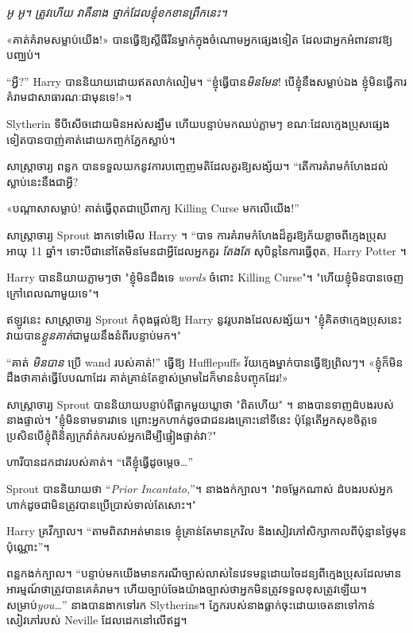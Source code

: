 \emph{អូ អូ។ ត្រូវហើយ វាគឺ\emph{នាង} ថ្នាក់ដែលខ្ញុំខកខានព្រឹកនេះ។}

«គាត់​គំរាម​សម្លាប់​យើង!» បានធ្វើឱ្យស្លីធីរីនម្នាក់ក្នុងចំណោមអ្នកផ្សេងទៀត ដែលជាអ្នកអំពាវនាវឱ្យបញ្ឈប់។

“អ្វី?” Harry បាននិយាយដោយឥតលាក់លៀម។ “ខ្ញុំធ្វើបាន\emph{មិនមែន}! បើ​ខ្ញុំ​នឹង​សម្លាប់​ឯង ខ្ញុំ​មិន​ធ្វើ​ការ​គំរាម​ជា​សាធារណៈ​ជា​មុន​ទេ!»។

Slytherin ទីបីសើចដោយមិនអស់សង្ឃឹម ហើយបន្ទាប់មកឈប់ភ្លាមៗ ខណៈដែលក្មេងប្រុសផ្សេងទៀតបានបាញ់គាត់ដោយកញ្ចក់ភ្នែកស្លាប់។

សាស្ត្រាចារ្យ ពន្លក បានទទួលយកនូវការបញ្ចេញមតិដែលគួរឱ្យសង្ស័យ។ “តើ​ការ​គំរាម​កំហែង​ដល់​ស្លាប់​នេះ​នឹង​ជា​អ្វី?

«​បណ្តាសា​សម្លាប់​! គាត់ធ្វើពុតជាប្រើពាក្យ Killing Curse មកលើយើង!”

សាស្រ្តាចារ្យ Sprout ងាកទៅមើល Harry ។ “បាទ ការគំរាមកំហែងដ៏គួរឱ្យភ័យខ្លាចពីក្មេងប្រុសអាយុ 11 ឆ្នាំ។ ទោះបីជានៅតែមិនមែនជាអ្វីដែលអ្នកគួរ \emph{តែងតែ} សុបិន្តនៃការធ្វើពុត, Harry Potter ។

Harry បាននិយាយភ្លាមៗថា "ខ្ញុំមិនដឹងទេ \emph{words} ចំពោះ Killing Curse"។ "ហើយ​ខ្ញុំ​មិន​បាន​ចេញ​ក្រៅ​ពេល​ណា​មួយ​ទេ"។

ឥឡូវនេះ សាស្រ្តាចារ្យ Sprout កំពុងផ្តល់ឱ្យ Harry នូវរូបរាងដែលសង្ស័យ។ "ខ្ញុំគិតថាក្មេងប្រុសនេះវាយបាន\emph{ខ្លួនគាត់}ជាមួយនឹងនំពីរបន្ទាប់មក។"

“គាត់ \emph{មិនបាន} ប្រើ wand របស់គាត់!” ធ្វើឱ្យ Hufflepuffs វ័យក្មេងម្នាក់បានធ្វើឱ្យព្រិលៗ។ «ខ្ញុំ​ក៏​មិន​ដឹង​ថា​គាត់​ធ្វើ​បែប​ណា​ដែរ គាត់​គ្រាន់​តែ​ខ្ទាស់​ម្រាមដៃ​ក៏​មាន​នំ​បញ្ចុក​ដែរ!»

សាស្ត្រាចារ្យ Sprout បាននិយាយបន្ទាប់ពីផ្អាកមួយឃ្លាថា "ពិតហើយ" ។ នាង​បាន​ទាញ​ដំបង​របស់​នាង​ផ្ទាល់។ "ខ្ញុំមិនទាមទារវាទេ ព្រោះអ្នកហាក់ដូចជាជនរងគ្រោះនៅទីនេះ ប៉ុន្តែតើអ្នកសុខចិត្តទេប្រសិនបើខ្ញុំពិនិត្យក្រវ៉ាត់ករបស់អ្នកដើម្បីផ្ទៀងផ្ទាត់វា?"

ហារីបានដកដាវរបស់គាត់។ “តើខ្ញុំធ្វើដូចម្តេច…”

Sprout បាននិយាយថា “\emph{Prior Incantato,}”។ នាង​ងក់​ក្បាល។ "វាចម្លែកណាស់ ដំបងរបស់អ្នកហាក់ដូចជាមិនត្រូវបានប្រើប្រាស់ទាល់តែសោះ។"

Harry គ្រវីក្បាល។ “តាម​ពិត​វា​អត់​មាន​ទេ ខ្ញុំ​គ្រាន់​តែ​មាន​ក្រវិល និង​សៀវភៅ​សិក្សា​កាល​ពី​ប៉ុន្មាន​ថ្ងៃ​មុន​ប៉ុណ្ណោះ”។

ពន្លកងក់ក្បាល។ “បន្ទាប់​មក​យើង​មាន​ករណី​ច្បាស់​លាស់​នៃ​វេទមន្ត​ដោយ​ចៃដន្យ​ពី​ក្មេង​ប្រុស​ដែល​មាន​អារម្មណ៍​ថា​ត្រូវ​បាន​គេ​គំរាម។ ហើយច្បាប់ចែងយ៉ាងច្បាស់ថាអ្នកមិនត្រូវទទួលខុសត្រូវឡើយ។ សម្រាប់\emph{you…}” នាងបានងាកទៅរក Slytherins។ ភ្នែករបស់នាងធ្លាក់ចុះដោយចេតនាទៅកាន់សៀវភៅរបស់ Neville ដែលដេកនៅលើឥដ្ឋ។

